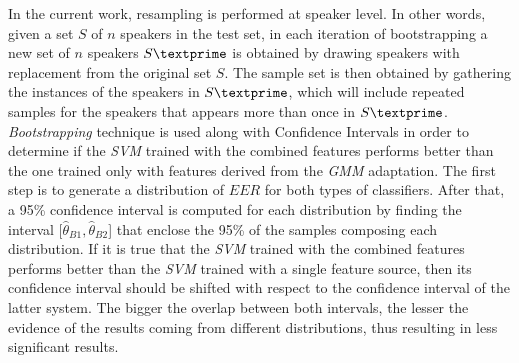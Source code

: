In the current work, resampling is performed at speaker level.
In other words, given a set $S$ of $n$ speakers in the
test set, in each iteration of bootstrapping
a new set of $n$ speakers $S\textprime$ is obtained by drawing speakers with replacement from the
original set $S$. The sample set is then obtained by gathering the instances of the speakers
in $S\textprime$, which will include repeated samples for the speakers that appears more than once
in $S\textprime$.
\textit{Bootstrapping} technique is used along with Confidence
Intervals in order to determine if the \textit{SVM} trained with the combined features
performs better than the one trained only with features derived from the \textit{GMM} adaptation.
The first step is to generate a distribution of $EER$ for both types of classifiers.
After that,
a 95\% confidence interval is computed for each distribution by finding the interval
[$\hat{\theta}_{B1}, \hat{\theta}_{B2}$] that enclose the 95\% of the samples
composing each distribution.
If it is true that the \textit{SVM} trained with
the combined features performs better than the
\textit{SVM} trained with a single feature source, then its confidence
interval should be shifted with respect to the confidence interval
of the latter system.
The bigger the overlap between both intervals, the
lesser the evidence of the results coming from different distributions, thus
resulting in less significant results.
